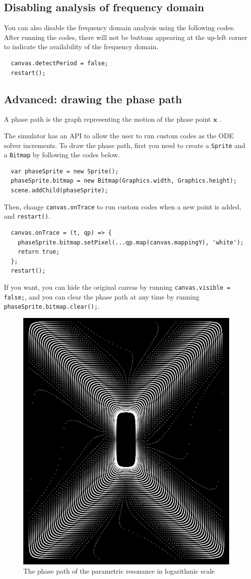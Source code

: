 \documentclass[12pt]{article}
\begin{document}
\subsection{Disabling analysis of frequency domain}

You can also disable the frequency domain analysis using the following codes.
After running the codes, there will not be buttons appearing at the up-left corner
to indicate the availability of the frequency domain.

\begin{verbatim}
  canvas.detectPeriod = false;
  restart();
\end{verbatim}

\subsection{Advanced: drawing the phase path}

A phase path is the graph representing the motion of the phase point $\mathbf x$ \cite[p. 146]{landau1976mechanics}\cite[p. 68]{arnold1989mathmech}.

The simulator has an API to allow the user to run custom codes as the ODE solver increments.
To draw the phase path, first you need to create a \texttt{Sprite} and a \texttt{Bitmap}
by following the codes below.

\begin{verbatim}
  var phaseSprite = new Sprite();
  phaseSprite.bitmap = new Bitmap(Graphics.width, Graphics.height);
  scene.addChild(phaseSprite);
\end{verbatim}

Then, change \texttt{canvas.onTrace} to run custom codes when a new point is added,
and \texttt{restart()}.

\begin{verbatim}
  canvas.onTrace = (t, qp) => {
    phaseSprite.bitmap.setPixel(...qp.map(canvas.mappingY), 'white');
    return true;
  };
  restart();
\end{verbatim}

If you want, you can hide the original canvas by running \texttt{canvas.visible = false;},
and you can clear the phase path at any time by running \texttt{phaseSprite.bitmap.clear();}.

\begin{figure}
  \centering
  \includegraphics[width=0.3\linewidth]{parametric_resonance_logarithmic_phase.png}
  \caption{The phase path of the parametric resonance in logarithmic scale}
  \label{fig:parametric_phase}
\end{figure}
\end{document}
